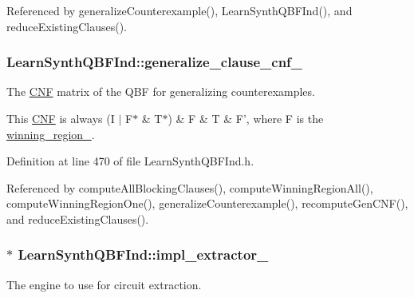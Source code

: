 Referenced by generalize\-Counterexample(), Learn\-Synth\-Q\-B\-F\-Ind(), and reduce\-Existing\-Clauses().

\hypertarget{classLearnSynthQBFInd_ad61b112cfcc60506f7b21c9ea9267b37}{
\subsubsection[{generalize\-\_\-clause\-\_\-cnf\-\_\-}]{ Learn\-Synth\-Q\-B\-F\-Ind\-::generalize\-\_\-clause\-\_\-cnf\-\_\-\hspace{0.3cm}{\ttfamily [protected]}}}\label{classLearnSynthQBFInd_ad61b112cfcc60506f7b21c9ea9267b37}


The \hyperlink{classCNF}{C\-N\-F} matrix of the Q\-B\-F for generalizing counterexamples. 

This \hyperlink{classCNF}{C\-N\-F} is always (I $|$ F$\ast$ \& T$\ast$) \& F \& T \& F', where F is the \hyperlink{classLearnSynthQBFInd_ab8ce6031137413e90e0626bbdc734be0}{winning\-\_\-region\-\_\-}. 

Definition at line 470 of file Learn\-Synth\-Q\-B\-F\-Ind.\-h.



Referenced by compute\-All\-Blocking\-Clauses(), compute\-Winning\-Region\-All(), compute\-Winning\-Region\-One(), generalize\-Counterexample(), recompute\-Gen\-C\-N\-F(), and reduce\-Existing\-Clauses().

\hypertarget{classLearnSynthQBFInd_a8c285416b6f27e86bdda92fd578327b8}{
\subsubsection[{impl\-\_\-extractor\-\_\-}]{$\ast$ Learn\-Synth\-Q\-B\-F\-Ind\-::impl\-\_\-extractor\-\_\-\hspace{0.3cm}{\ttfamily [protected]}}}\label{classLearnSynthQBFInd_a8c285416b6f27e86bdda92fd578327b8}


The engine to use for circuit extraction. 

